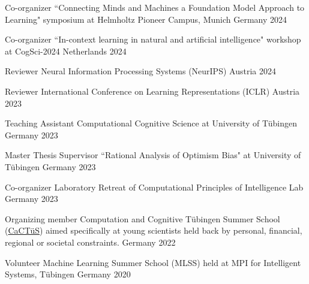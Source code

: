 
\begin{cvhonors}

  \cvhonor
    {Co-organizer} %
    {``Connecting Minds and Machines a Foundation Model Approach to Learning" symposium at Helmholtz Pioneer Campus, Munich} %
    {Germany} %
    {2024} %
    
  \cvhonor
    {Co-organizer} %
    {``In-context learning in natural and artificial intelligence" workshop at CogSci-2024} %
    {Netherlands} %
    {2024} %
    
   \cvhonor
    {Reviewer} %
    {Neural Information Processing Systems (NeurIPS)} %
    {Austria} %
    {2024} %
    
  \cvhonor
    {Reviewer} %
    {International Conference on Learning Representations (ICLR)} %
    {Austria} %
    {2023} %
    
  \cvhonor
    {Teaching Assistant} %
    {Computational Cognitive Science at University of Tübingen} %
    {Germany} %
    {2023} %

  \cvhonor
    {Master Thesis Supervisor} %
    {``Rational Analysis of Optimism Bias" at University of Tübingen} %
    {Germany} %
    {2023} %

  \cvhonor
    {Co-organizer} %
    {Laboratory Retreat of Computational Principles of Intelligence Lab} %
    {Germany} %
    {2023} %

    \cvhonor
    {Organizing member} %
    {Computation and Cognitive Tübingen Summer School (\href{https://www.projects.tuebingen.mpg.de/}{CaCTüS}) aimed specifically at young scientists held back by personal, financial, regional or societal constraints.} %
    {Germany} %
    {2022} %

    \cvhonor
    {Volunteer} %
    {Machine Learning Summer School (MLSS) held at MPI for Intelligent Systems, Tübingen} %
    {Germany} %
    {2020} %
    
    \\
    
\end{cvhonors}

